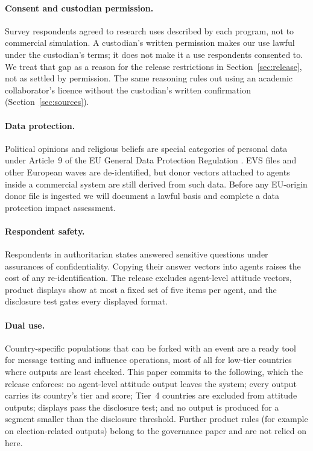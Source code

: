 \documentclass[10pt]{article}
\begin{document}
\paragraph{Consent and custodian permission.} Survey respondents agreed to research uses described by each program, not to commercial simulation. A custodian's written permission makes our use lawful under the custodian's terms; it does not make it a use respondents consented to. We treat that gap as a reason for the release restrictions in Section~\ref{sec:release}, not as settled by permission. The same reasoning rules out using an academic collaborator's licence without the custodian's written confirmation (Section~\ref{sec:sources}).

\paragraph{Data protection.} Political opinions and religious beliefs are special categories of personal data under Article~9 of the EU General Data Protection Regulation \citep{gdpr}. EVS files and other European waves are de-identified, but donor vectors attached to agents inside a commercial system are still derived from such data. Before any EU-origin donor file is ingested we will document a lawful basis and complete a data protection impact assessment.

\paragraph{Respondent safety.} Respondents in authoritarian states answered sensitive questions under assurances of confidentiality. Copying their answer vectors into agents raises the cost of any re-identification. The release excludes agent-level attitude vectors, product displays show at most a fixed set of five items per agent, and the disclosure test gates every displayed format.

\paragraph{Dual use.} Country-specific populations that can be forked with an event are a ready tool for message testing and influence operations, most of all for low-tier countries where outputs are least checked. This paper commits to the following, which the release enforces: no agent-level attitude output leaves the system; every output carries its country's tier and score; Tier~4 countries are excluded from attitude outputs; displays pass the disclosure test; and no output is produced for a segment smaller than the disclosure threshold. Further product rules (for example on election-related outputs) belong to the governance paper and are not relied on here.
\end{document}
